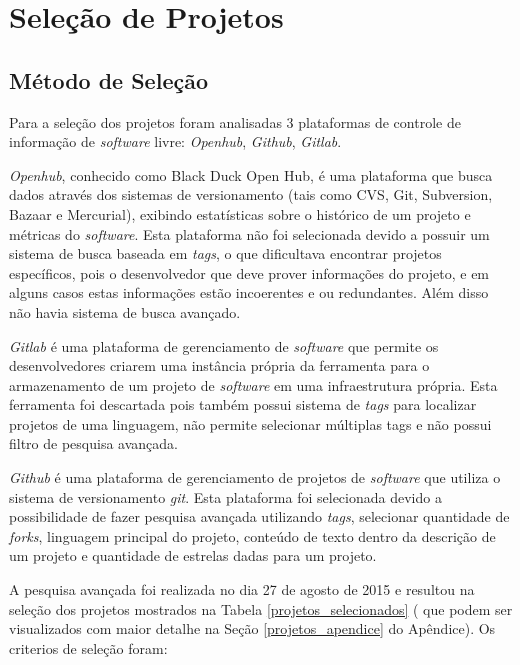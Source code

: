 \section{Seleção de Projetos}

\subsection{Método de Seleção}

Para a seleção dos projetos foram analisadas 3 plataformas de controle de informação
de \textit{software} livre: \textit{Openhub}, \textit{Github}, \textit{Gitlab}.

\textit{Openhub}, conhecido como Black Duck Open Hub, é uma plataforma que busca dados através
 dos sistemas de versionamento (tais como CVS, Git, Subversion, Bazaar e Mercurial),
 exibindo estatísticas sobre o histórico de um projeto e métricas do \textit{software}.
 Esta plataforma não foi selecionada devido a possuir um sistema de busca baseada em \textit{tags},
 o que dificultava encontrar projetos específicos, pois o desenvolvedor que deve prover
 informações do projeto, e em alguns casos estas informações estão incoerentes e ou
 redundantes. Além disso não havia sistema de busca avançado.

\textit{Gitlab} é uma plataforma de gerenciamento de \textit{software} que permite os
 desenvolvedores criarem uma instância própria da ferramenta para o armazenamento
 de um projeto de \textit{software} em uma infraestrutura própria. Esta ferramenta foi
 descartada pois também possui sistema de \textit{tags} para localizar projetos de uma linguagem,
não permite selecionar múltiplas tags e não possui filtro de pesquisa avançada.

\textit{Github} é uma plataforma de gerenciamento de projetos de \textit{software} que
utiliza o sistema de versionamento \textit{git}. Esta plataforma foi selecionada devido a
 possibilidade de fazer pesquisa avançada utilizando \textit{tags}, selecionar quantidade de \textit{forks},
 linguagem principal do projeto, conteúdo de texto dentro da descrição de um projeto e
 quantidade de estrelas dadas para um projeto.

A pesquisa avançada foi realizada no dia 27 de agosto de 2015 e resultou na seleção dos
 projetos mostrados na Tabela \ref{projetos_selecionados}
 ( que podem ser visualizados com maior detalhe na Seção 
\ref{projetos_apendice} do Apêndice). Os criterios de seleção foram: 

